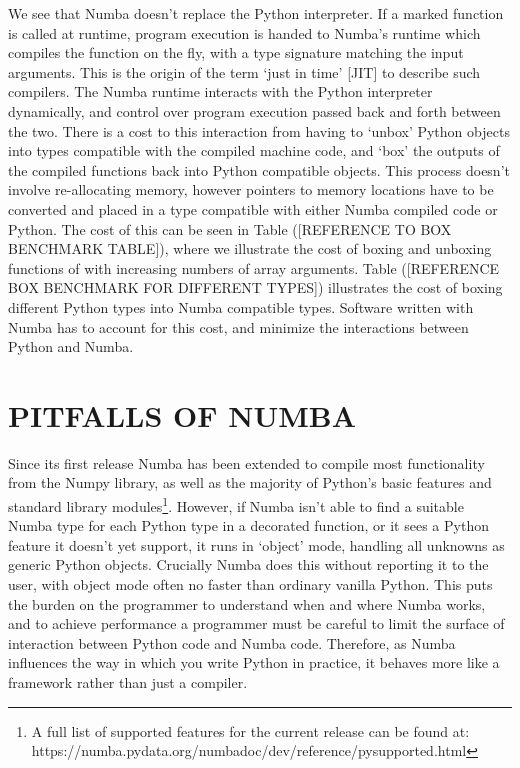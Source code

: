 \documentclass{IEEEcsmag}
\begin{document}
We see that Numba doesn't replace the Python interpreter. If a marked function is called at runtime, program execution is handed to Numba's runtime which compiles the function on the fly, with a type signature matching the input arguments. This is the origin of the term `just in time' [JIT] to describe such compilers. The Numba runtime interacts with the Python interpreter dynamically, and control over program execution passed back and forth between the two. There is a cost to this interaction from having to `unbox' Python objects into types compatible with the compiled machine code, and `box' the outputs of the compiled functions back into Python compatible objects. This process doesn't involve re-allocating memory, however pointers to memory locations have to be converted and placed in a type compatible with either Numba compiled code or Python. The cost of this can be seen in Table ([REFERENCE TO BOX BENCHMARK TABLE]), where we illustrate the cost of boxing and unboxing functions of with increasing numbers of array arguments. Table ([REFERENCE BOX BENCHMARK FOR DIFFERENT TYPES]) illustrates the cost of boxing different Python types into Numba compatible types. Software written with Numba has to account for this cost, and minimize the interactions between Python and Numba.



\section{PITFALLS OF NUMBA}

Since its first release Numba has been extended to compile most functionality from the Numpy library, as well as the majority of Python's basic features and standard library modules\footnote{A full list of supported features for the current release can be found at: https://numba.pydata.org/numba\-doc/dev/reference/pysupported.html}. However, if Numba isn't able to find a suitable Numba type for each Python type in a decorated function, or it sees a Python feature it doesn't yet support, it runs in `object' mode, handling all unknowns as generic Python objects. Crucially Numba does this without reporting it to the user, with object mode often no faster than ordinary vanilla Python. This puts the burden on the programmer to understand when and where Numba works, and to achieve performance a programmer must be careful to limit the surface of interaction between Python code and Numba code. Therefore, as Numba influences the way in which you write Python in practice, it behaves more like a framework rather than just a compiler.
\end{document}
